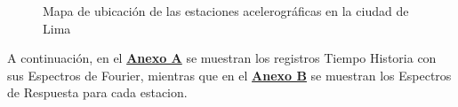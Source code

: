 \documentclass[11pt, a4paper]{report}
\begin{document}
\begin{figure}[!h]
    \centering
            \caption{Mapa de ubicación de las estaciones acelerográficas en la ciudad de Lima}
            \label{fig:fig02}
            \setlength\fboxsep{0pt}
            \setlength\fboxrule{0.3pt}
\end{figure}

\vspace{1cm}

\noindent
A continuación, en el \hyperlink{anexoA}{\textbf{Anexo A}} se muestran los registros Tiempo Historia con sus Espectros de Fourier, mientras que
en el \hyperlink{anexoB}{\textbf{Anexo B}} se muestran los Espectros de Respuesta para cada estacion.

\newpage

\clearpage



\vspace*{\fill}%
\noindent
{}
\vfill
\end{document}
